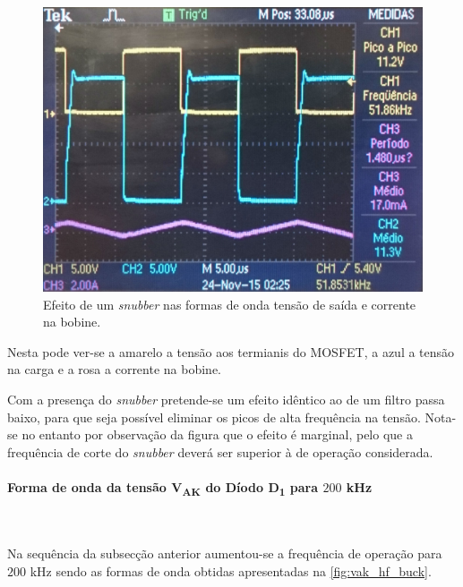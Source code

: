 \documentclass[a4paper,11pt]{article}
\numberwithin{equation}{section}
\begin{document}
\begin{figure}[H]
	\centering
	\includegraphics[keepaspectratio=true, scale=0.175]{img/figs/snubber_buck}
	\caption{Efeito de um \textit{snubber} nas formas de onda tensão de saída e corrente na bobine.}
	\label{fig:snubber_buck}
	\vspace{-0.8em}
\end{figure}

Nesta pode ver-se a amarelo a tensão aos termianis do MOSFET, a azul a tensão na carga e a rosa a corrente na bobine.

Com a presença do \textit{snubber} pretende-se um efeito idêntico ao de um filtro passa baixo, para que seja possível eliminar os picos de alta frequência na tensão. Nota-se no entanto por observação da figura que o efeito é marginal, pelo que a frequência de corte do \textit{snubber}
deverá ser superior à de operação considerada.

\paragraph{Forma de onda da tensão V\textsubscript{AK} do Díodo D\textsubscript{1} para $200$ kHz}\mbox{}\

Na sequência da subsecção anterior aumentou-se a frequência de operação para $200$ kHz sendo as formas de onda obtidas apresentadas na \autoref{fig:vak_hf_buck}.
\end{document}
